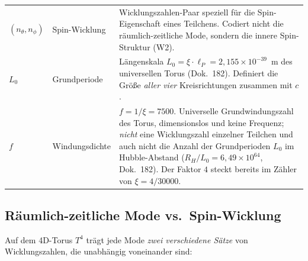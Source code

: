 \begin{center}
{{\begin{tabular}{>{\raggedright\arraybackslash}p{2.6cm}>{\raggedright\arraybackslash}p{2.8cm}>{\raggedright\arraybackslash}p{7.4cm}}
$(n_\theta, n_\phi)$ &
  Spin-Wicklung &
  Wicklungszahlen-Paar speziell für die Spin-Eigenschaft eines Teilchens. Codiert nicht die räumlich-zeitliche Mode, sondern die innere Spin-Struktur (W2). \\
$L_0$ &
  Grundperiode &
  Längenskala $L_0 = \xi\cdot\ell_P = 2{,}155\times10^{-39}$~m des universellen Torus (Dok.~182). Definiert die Größe \emph{aller vier} Kreisrichtungen zusammen mit $c$. \\
$f$ &
  Windungsdichte &
  $f = 1/\xi = 7500$. Universelle Grundwindungszahl des Torus, dimensionslos und keine Frequenz; \emph{nicht} eine Wicklungszahl einzelner Teilchen und auch nicht die Anzahl der Grundperioden $L_0$ im Hubble-Abstand ($R_H/L_0 = 6{,}49\times10^{64}$, Dok.~182). Der Faktor $4$ steckt bereits im Zähler von $\xi = 4/30000$. \\
\bottomrule
\end{tabular}%
}
}
\renewcommand{\arraystretch}{1.0}
\end{center}

\subsection*{Räumlich-zeitliche Mode vs.\ Spin-Wicklung}

Auf dem 4D-Torus $T^4$ trägt jede Mode \emph{zwei verschiedene
Sätze} von Wicklungszahlen, die unabhängig voneinander sind:

\begin{center}
\renewcommand{\arraystretch}{1.4}
\setlength{\tabcolsep}{8pt}
\setlength{\tabcolsep}{6pt}
\renewcommand{\arraystretch}{1.0}
\end{center}

